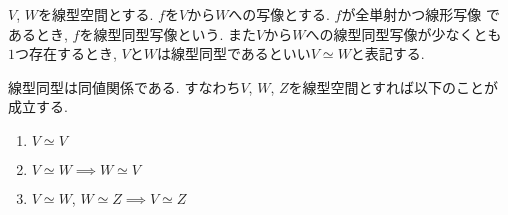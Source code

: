 \documentclass[11pt, a4paper, dvipdfmx]{jsarticle}
\theoremstyle{definition}
\newtheorem[S]{Def+}[Axiom+]{Definition}
\newtheorem[S]{Thm+}[Axiom+]{Theorem}
\newtheorem[S]{Prop+}[Axiom+]{Proposition}
\newtheorem[S]{Lemma+}[Axiom+]{Lemma}
\begin{document}
\begin{Def+}
    $V$, $W$を線型空間とする. $f$を$V$から$W$への写像とする. $f$が全単射かつ線形写像
    であるとき, $f$を線型同型写像という. また$V$から$W$への線型同型写像が少なくとも
    $1$つ存在するとき, $V$と$W$は線型同型であるといい$V\simeq W$と表記する.
\end{Def+}
\begin{Thm+}[線型同型の性質]
    線型同型は同値関係である. すなわち$V$, $W$, $Z$を線型空間とすれば以下のことが成立する.
    \begin{enumerate}
        \item $V\simeq V$
        \item $V\simeq W$$\implies$$W\simeq V$
        \item $V\simeq W$, $W\simeq Z$$\implies$$V\simeq Z$
    \end{enumerate}
\end{Thm+}
\end{document}
